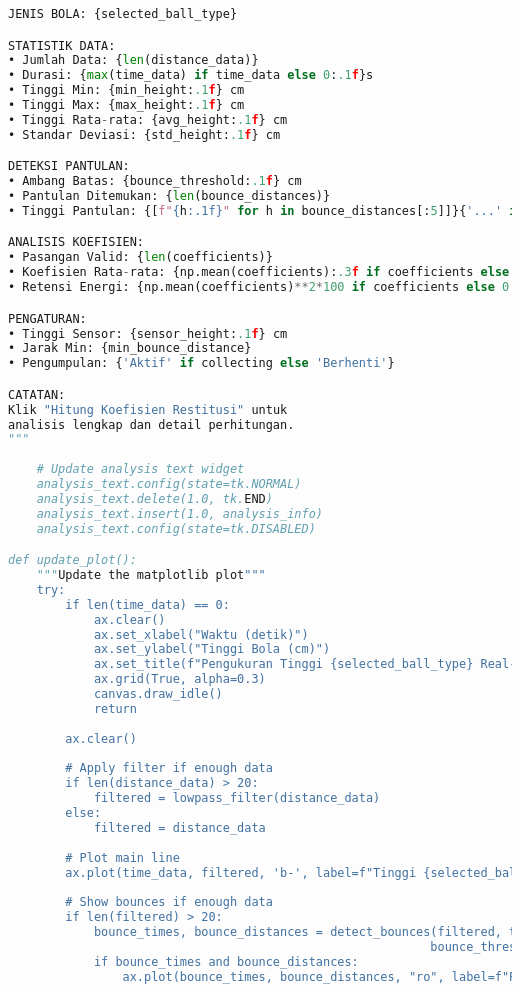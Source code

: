 \begin{itemize}
\begin{scriptsize}
\begin{lstlisting}[language=python]
JENIS BOLA: {selected_ball_type}

STATISTIK DATA:
• Jumlah Data: {len(distance_data)}
• Durasi: {max(time_data) if time_data else 0:.1f}s
• Tinggi Min: {min_height:.1f} cm
• Tinggi Max: {max_height:.1f} cm
• Tinggi Rata-rata: {avg_height:.1f} cm
• Standar Deviasi: {std_height:.1f} cm

DETEKSI PANTULAN:
• Ambang Batas: {bounce_threshold:.1f} cm
• Pantulan Ditemukan: {len(bounce_distances)}
• Tinggi Pantulan: {[f"{h:.1f}" for h in bounce_distances[:5]]}{'...' if len(bounce_distances) > 5 else ''}

ANALISIS KOEFISIEN:
• Pasangan Valid: {len(coefficients)}
• Koefisien Rata-rata: {np.mean(coefficients):.3f if coefficients else 'N/A'}
• Retensi Energi: {np.mean(coefficients)**2*100 if coefficients else 0:.1f}%

PENGATURAN:
• Tinggi Sensor: {sensor_height:.1f} cm
• Jarak Min: {min_bounce_distance}
• Pengumpulan: {'Aktif' if collecting else 'Berhenti'}

CATATAN:
Klik "Hitung Koefisien Restitusi" untuk 
analisis lengkap dan detail perhitungan.
"""
    
    # Update analysis text widget
    analysis_text.config(state=tk.NORMAL)
    analysis_text.delete(1.0, tk.END)
    analysis_text.insert(1.0, analysis_info)
    analysis_text.config(state=tk.DISABLED)

def update_plot():
    """Update the matplotlib plot"""
    try:
        if len(time_data) == 0:
            ax.clear()
            ax.set_xlabel("Waktu (detik)")
            ax.set_ylabel("Tinggi Bola (cm)")
            ax.set_title(f"Pengukuran Tinggi {selected_ball_type} Real-time")
            ax.grid(True, alpha=0.3)
            canvas.draw_idle()
            return
        
        ax.clear()
        
        # Apply filter if enough data
        if len(distance_data) > 20:
            filtered = lowpass_filter(distance_data)
        else:
            filtered = distance_data
        
        # Plot main line
        ax.plot(time_data, filtered, 'b-', label=f"Tinggi {selected_ball_type}", linewidth=2)
        
        # Show bounces if enough data
        if len(filtered) > 20:
            bounce_times, bounce_distances = detect_bounces(filtered, time_data, 
                                                           bounce_threshold, min_bounce_distance)
            if bounce_times and bounce_distances:
                ax.plot(bounce_times, bounce_distances, "ro", label=f"Puncak Pantulan", markersize=8)
                

\end{lstlisting}
\end{scriptsize}
\end{itemize}
